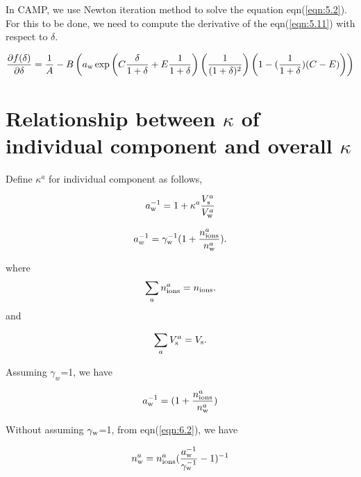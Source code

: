 \documentclass[12pt]{article}
\begin{document}
In CAMP, we use Newton iteration method to solve the equation eqn(\ref{eqn:5.2}). For this to be done, we need to compute the derivative of the eqn(\ref{eqn:5.11}) with respect to $\delta$.

\begin{equation}\label{eqn:5.12}
\frac{\partial{f( \delta)} } {\partial{\delta}} =
\frac{1}{A} -B \left(a_{\rm w}\exp{\left(C \frac{\delta}{1+\delta} +E \frac{1}{1+\delta}\right)}   
\left(\frac{1}{(1+\delta)^{2}}\right)
\left(1-(\frac{1}{1+\delta})(C-E) \right)
\right)
\end{equation}

\section{Relationship between $\kappa$ of individual component and overall $\kappa$}

Define $\kappa^{a}$ for individual component as follows, 

\begin{equation}\label{eqn:6.1}
a_{\rm w}^{-1}=1+\kappa^{a} \frac{V_{\rm s}^{a}}{V_{\rm w}^{a}} 
\end{equation}

\begin{equation}\label{eqn:6.2}
a_{w}^{-1}=\gamma_{\rm w}^{-1} (1+\frac{n_{\rm ions}^{a}}{n_{\rm w}^{a}}).
\end{equation}

where
\begin{equation}\label{eqn:6.3}
\sum_{a} n_{\rm ions}^{a}=n_{\rm ions}.
\end{equation}
 and 
 
\begin{equation}\label{eqn:6.4}
\sum_{a} V_{\rm s}^{a}=V_{\rm s}.
\end{equation}

Assuming $\gamma_{w}$=1, we have 

\begin{equation}\label{eqn:6.5}
a_{\rm w}^{-1}=(1+\frac{n_{\rm ions}^{a}}{n_{\rm w}^{a}})
\end{equation}

Without assuming $\gamma_{\rm w}$=1, from eqn(\ref{eqn:6.2}), we have

\begin{equation}\label{eqn:6.6}
n_{\rm w}^{a}=n_{\rm ions}^{a}(\frac{a_{\rm w}^{-1}}{\gamma_{\rm w}^{-1}}-1)^{-1}
\end{equation}
\end{document}
